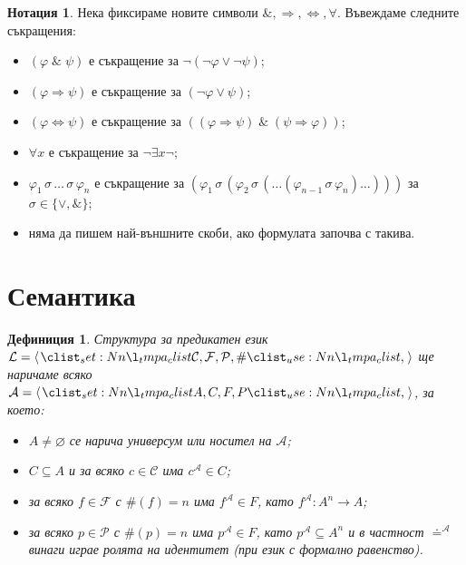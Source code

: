\documentclass[12pt]{article}
\newcommand{\logand}{\; \& \;}
\newcommand{\calA}{\mathcal{A}}
\newcommand{\calL}{\mathcal{L}}
\newcommand{\calF}{\mathcal{F}}
\newcommand{\calP}{\mathcal{P}}
\newcommand{\calC}{\mathcal{C}}
\newtheorem*{definition}{Дефиниция}
\theoremstyle{definition}
\newtheorem*{notation}{Нотация}
\begin{document}
\begin{notation}
    Нека фиксираме новите символи $\&, \Rightarrow, \Leftrightarrow, \forall$.
    Въвеждаме следните съкращения:
    \begin{itemize}
        \item $(\varphi \logand \psi)$ е съкращение за $\neg (\neg \varphi \lor \neg \psi)$;
        \item $(\varphi \Rightarrow \psi)$ е съкращение за $(\neg \varphi \lor \psi)$;
        \item $(\varphi \Leftrightarrow \psi)$ е съкращение за $((\varphi \Rightarrow \psi) \logand (\psi \Rightarrow \varphi))$;
        \item $\forall x$ е съкращение за $\neg \exists x \neg$;
        \item $\varphi_1 \, \sigma \, \dots \, \sigma \, \varphi_n$ е съкращение за $(\varphi_1 \, \sigma \, (\varphi_2 \, \sigma \, (\dots (\varphi_{n - 1} \, \sigma \, \varphi_n) \dots )))$ за $\sigma \in \{ \lor, \& \}$;
        \item няма да пишем най-външните скоби, ако формулата започва с такива.
    \end{itemize}
\end{notation}

\newpage

\section{Семантика}

\begin{definition}
    Структура за предикатен език $\calL = \opair{\calC, \calF, \calP, \#}$ ще наричаме всяко $\calA = \opair{A, C, F, P}$, за което:
    \begin{itemize}
        \item $A \neq \varnothing$ се нарича универсум или носител на $\calA$;
        \item $C \subseteq A$ и за всяко $c \in \calC$ има $c^\calA \in C$;
        \item за всяко $f \in \calF$ с $\#(f) = n$ има $f^\calA \in F$, като $f^\calA : A^n \rightarrow A$;
        \item за всяко $p \in \calP$ с $\#(p) = n$ има $p^\calA \in F$, като $p^\calA \subseteq A^n$ и в частност $\doteq^\calA$ винаги играе ролята на идентитет (при език с формално равенство).
    \end{itemize}
\end{definition}
\end{document}
